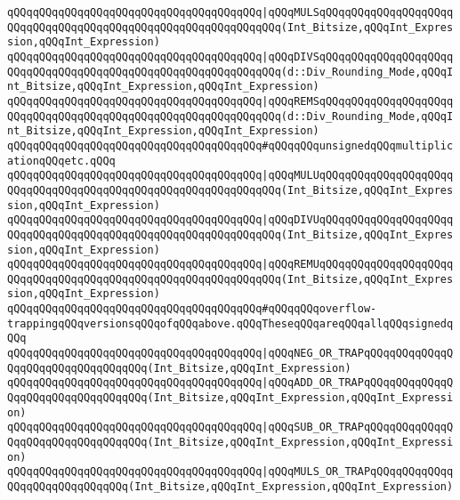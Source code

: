 \verb|qQQqqQQqqQQqqQQqqQQqqQQqqQQqqQQqqQQqqQQq|\verb#|qQQqMULSqQQqqQQqqQQqqQQqqQQqqQQqqQQqqQQqqQQqqQQqqQQqqQQqqQQqqQQqqQQqqQQq(Int_Bitsize,qQQqInt_Expression,qQQqInt_Expression)#\newline
\verb|qQQqqQQqqQQqqQQqqQQqqQQqqQQqqQQqqQQqqQQq|\verb#|qQQqDIVSqQQqqQQqqQQqqQQqqQQqqQQqqQQqqQQqqQQqqQQqqQQqqQQqqQQqqQQqqQQqqQQq(d::Div_Rounding_Mode,qQQqInt_Bitsize,qQQqInt_Expression,qQQqInt_Expression)#\newline
\verb|qQQqqQQqqQQqqQQqqQQqqQQqqQQqqQQqqQQqqQQq|\verb#|qQQqREMSqQQqqQQqqQQqqQQqqQQqqQQqqQQqqQQqqQQqqQQqqQQqqQQqqQQqqQQqqQQqqQQq(d::Div_Rounding_Mode,qQQqInt_Bitsize,qQQqInt_Expression,qQQqInt_Expression)#\newline
\newline
\verb|qQQqqQQqqQQqqQQqqQQqqQQqqQQqqQQqqQQqqQQq#qQQqqQQqunsignedqQQqmultiplicationqQQqetc.qQQq|\newline
\verb|qQQqqQQqqQQqqQQqqQQqqQQqqQQqqQQqqQQqqQQq|\verb#|qQQqMULUqQQqqQQqqQQqqQQqqQQqqQQqqQQqqQQqqQQqqQQqqQQqqQQqqQQqqQQqqQQqqQQq(Int_Bitsize,qQQqInt_Expression,qQQqInt_Expression)#\newline
\verb|qQQqqQQqqQQqqQQqqQQqqQQqqQQqqQQqqQQqqQQq|\verb#|qQQqDIVUqQQqqQQqqQQqqQQqqQQqqQQqqQQqqQQqqQQqqQQqqQQqqQQqqQQqqQQqqQQqqQQq(Int_Bitsize,qQQqInt_Expression,qQQqInt_Expression)#\newline
\verb|qQQqqQQqqQQqqQQqqQQqqQQqqQQqqQQqqQQqqQQq|\verb#|qQQqREMUqQQqqQQqqQQqqQQqqQQqqQQqqQQqqQQqqQQqqQQqqQQqqQQqqQQqqQQqqQQqqQQq(Int_Bitsize,qQQqInt_Expression,qQQqInt_Expression)#\newline
\newline
\verb|qQQqqQQqqQQqqQQqqQQqqQQqqQQqqQQqqQQqqQQq#qQQqqQQqoverflow-trappingqQQqversionsqQQqofqQQqabove.qQQqTheseqQQqareqQQqallqQQqsignedqQQq|\newline
\verb|qQQqqQQqqQQqqQQqqQQqqQQqqQQqqQQqqQQqqQQq|\verb#|qQQqNEG_OR_TRAPqQQqqQQqqQQqqQQqqQQqqQQqqQQqqQQqqQQq(Int_Bitsize,qQQqInt_Expression)#\newline
\verb|qQQqqQQqqQQqqQQqqQQqqQQqqQQqqQQqqQQqqQQq|\verb#|qQQqADD_OR_TRAPqQQqqQQqqQQqqQQqqQQqqQQqqQQqqQQqqQQq(Int_Bitsize,qQQqInt_Expression,qQQqInt_Expression)#\newline
\verb|qQQqqQQqqQQqqQQqqQQqqQQqqQQqqQQqqQQqqQQq|\verb#|qQQqSUB_OR_TRAPqQQqqQQqqQQqqQQqqQQqqQQqqQQqqQQqqQQq(Int_Bitsize,qQQqInt_Expression,qQQqInt_Expression)#\newline
\verb|qQQqqQQqqQQqqQQqqQQqqQQqqQQqqQQqqQQqqQQq|\verb#|qQQqMULS_OR_TRAPqQQqqQQqqQQqqQQqqQQqqQQqqQQqqQQq(Int_Bitsize,qQQqInt_Expression,qQQqInt_Expression)#\newline
